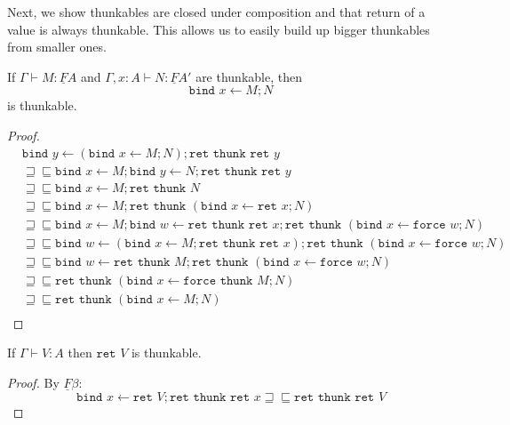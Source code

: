 \documentclass[acmsmall,nonacm]{acmart}
\renewcommand{\u}{\underline}
\newcommand{\ltdyn}{\sqsubseteq}
\newcommand{\gtdyn}{\sqsupseteq}
\newcommand{\equidyn}{\mathrel{\gtdyn\ltdyn}}
\newcommand{\bindXtoYinZ}[2]{\kw{bind}#2 \leftarrow #1;}
\newcommand{\kw}[1]{\texttt{#1}\,\,}
\newcommand{\ret}{\kw{ret}}
\newcommand{\thunk}{\kw{thunk}}
\newcommand{\force}{\kw{force}}
\begin{document}
{\begin{longonly}
Next, we show thunkables are closed under composition and that return
of a value is always thunkable.  This allows us to easily build up
bigger thunkables from smaller ones.
\begin{lemma}
  If $\Gamma \vdash M : \u F A$ and $\Gamma, x : A \vdash N : \u F A'$
  are thunkable, then
  \[ \bindXtoYinZ M x N \]
  is thunkable.
\end{lemma}
\begin{proof}
  \begin{align*}
    &\bindXtoYinZ {(\bindXtoYinZ M x N)} y \ret\thunk\ret y\\
    &\equidyn \bindXtoYinZ M x \bindXtoYinZ N y \ret\thunk\ret y\tag{$\u F\eta$}\\
    &\equidyn \bindXtoYinZ M x \ret \thunk N \tag{$N$ thunkable}\\
    &\equidyn \bindXtoYinZ M x \ret \thunk (\bindXtoYinZ {\ret x} x N)\tag{$\u F\beta$}\\
    &\equidyn \bindXtoYinZ M x \bindXtoYinZ {\ret\thunk\ret x} w \ret \thunk (\bindXtoYinZ {\force w} x N)\tag{$\u F\beta,U\beta$}\\
    &\equidyn \bindXtoYinZ {(\bindXtoYinZ M x \ret\thunk\ret x)} w \ret \thunk (\bindXtoYinZ {\force w} x N)\tag{$\u F\eta$}\\
    &\equidyn \bindXtoYinZ {\ret\thunk M} w \ret \thunk (\bindXtoYinZ {\force w} x N)\tag{$M$ thunkable}\\
    &\equidyn  \ret \thunk (\bindXtoYinZ {\force \thunk M} x N)\tag{$\u F\beta$}\\
    &\equidyn  \ret \thunk (\bindXtoYinZ {M} x N)\tag{$U\beta$}\\
  \end{align*}
\end{proof}

\begin{lemma}
  If $\Gamma \vdash V : A$ then $\ret V$ is thunkable.
\end{lemma}
\begin{proof}
  By $\u F\beta$:
  \[ \bindXtoYinZ {\ret V} x \ret\thunk\ret x \equidyn \ret\thunk\ret V \]
\end{proof}


\end{longonly}}
\end{document}
